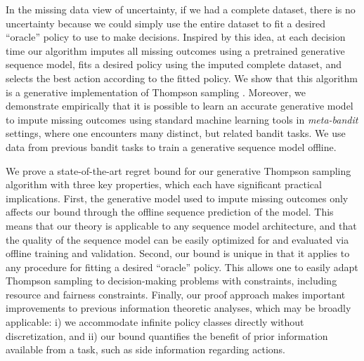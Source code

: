 In the missing data view of uncertainty, if we had a complete dataset, there is no uncertainty because we could simply use the entire dataset to fit a desired ``oracle'' policy to use to make decisions. Inspired by this idea, at each decision time our algorithm imputes all missing outcomes using a pretrained generative sequence model, fits a desired policy using the imputed complete dataset, and selects the best action according to the fitted policy. We show that this algorithm is a generative implementation of Thompson sampling \citep{russo2020tutorial}. Moreover, we demonstrate empirically that it is possible to learn an accurate generative model to impute missing outcomes using standard machine learning tools in \textit{meta-bandit} settings, where one encounters many distinct, but related bandit tasks. We use data from previous bandit tasks to train  a generative sequence model offline.

We prove a state-of-the-art regret bound for our generative Thompson sampling algorithm with three key properties, which each have significant practical implications. First, the generative model used to impute missing outcomes only affects our bound through the offline sequence prediction of the model. This means that our theory is applicable to any sequence model architecture, and that the quality of the sequence model can be easily optimized for and evaluated via offline training and validation. Second, our bound is unique in that it applies to any procedure for fitting a desired ``oracle'' policy. This allows one to easily adapt Thompson sampling to decision-making problems with constraints, including resource and fairness constraints. Finally, our proof approach makes important improvements to previous information theoretic analyses, which may be broadly applicable: i) we accommodate infinite policy classes directly without discretization, and ii) our bound quantifies the benefit of prior information available from a task, such as side information regarding actions. 

